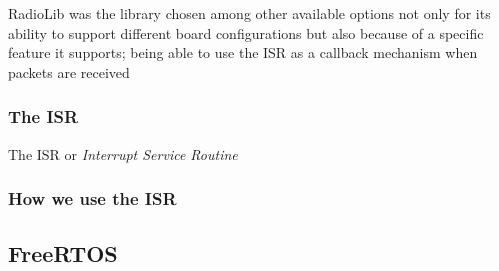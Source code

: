 RadioLib was the library chosen among other available options not only for its ability to support different board configurations but also because of a specific feature it supports; being able to use the ISR as a callback mechanism when packets are received
\subsubsection{The ISR}
The ISR or \textit{Interrupt Service Routine}
\subsubsection{How we use the ISR}
\subsection{FreeRTOS}
